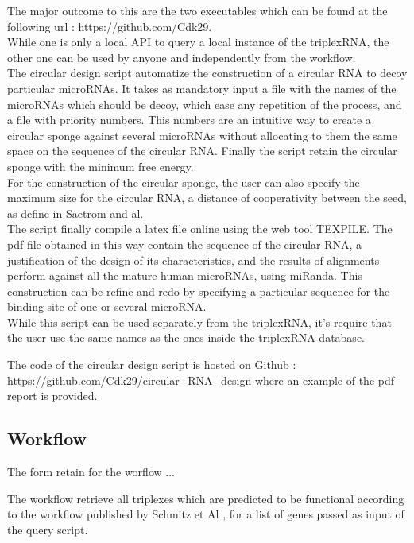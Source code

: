 \documentclass[a4paper,12pt]{report}
\begin{document}
The major outcome to this are the two executables which can be found at the following url : https://github.com/Cdk29.\\

While one is only a local API to query a local instance of the triplexRNA, the other one can be used by anyone and independently from the workflow.\\

The circular design script automatize the construction of a circular RNA to decoy particular microRNAs. It takes as mandatory input a file with the names of the microRNAs which should be decoy, which ease any repetition of the process, and a file with priority numbers. This numbers are an intuitive way to create a circular sponge against several microRNAs without allocating to them the same space on the sequence of the circular RNA. Finally the script retain the circular sponge with the minimum free energy.\\

For the construction of the circular sponge, the user can also specify the maximum size for the circular RNA, a distance of cooperativity between the seed, as define in Saetrom and al\cite{coop}. \\

The script finally compile a latex file online using the web tool TEXPILE. The pdf file obtained in this way contain the sequence of the circular RNA, a justification of the design of its characteristics, and the results of alignments perform against all the mature human microRNAs, using miRanda. This construction can be refine and redo by specifying a particular sequence for the binding site of one or several microRNA. \\

While this script can be used separately from the triplexRNA, it's require that the user use the same names as the ones inside the triplexRNA database\cite{triplex}. 

The code of the circular design script is hosted on Github : https://github.com/Cdk29/circular\_RNA\_design where an example of the pdf report is provided.

\subsection{Workflow}

The form retain for the worflow ...

The workflow retrieve all triplexes which are predicted to be functional according to the workflow published by Schmitz et Al \cite{triplex}, for a list of genes passed as input of the query script.\\
\end{document}
